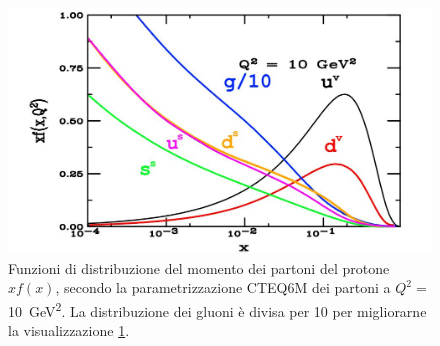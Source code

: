        \begin{figure}[h]
            \centering
            \includegraphics[width=0.71\linewidth]{res/fig/1-chapter/6-pdf-momentum-proton.jpg}
            \caption{Funzioni di distribuzione del momento dei partoni del protone $xf(x)$, secondo la parametrizzazione CTEQ6M dei partoni a $Q^2 =$ \qty{10}{\giga \eV^2}. La distribuzione dei gluoni è divisa per 10 per migliorarne la visualizzazione \ref{fig:6-pdf-momentum-proton}.}
            \label{fig:6-pdf-momentum-proton}
        \end{figure}

\newpage

